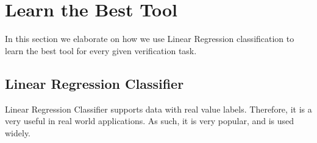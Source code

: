 \section{Learn the Best Tool}
\label{classification}
In this section we elaborate on how we use Linear Regression classification to learn the best tool for every given verification task.

\subsection{Linear Regression Classifier}
Linear Regression Classifier supports data with real value labels. Therefore, it is a very useful in real world applications. As such, it is very popular, and is used widely. 